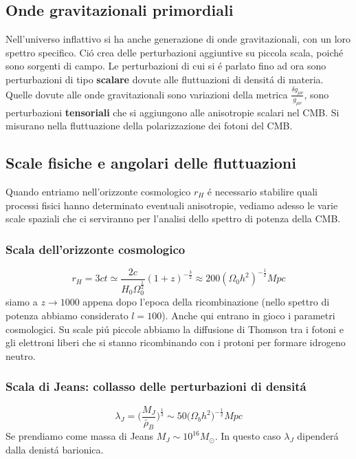 \documentclass[12pt, a4paper]{article}
\begin{document}
\subsection{Onde gravitazionali primordiali}
Nell'universo inflattivo si ha anche generazione di onde gravitazionali, con un loro spettro specifico. Ci\'{o} crea delle perturbazioni aggiuntive su piccola scala, poich\'{e} sono sorgenti di campo. Le perturbazioni di cui si \'{e} parlato fino ad ora sono perturbazioni di tipo \textbf{scalare} dovute alle fluttuazioni di densit\'{a} di materia. Quelle dovute alle onde gravitazionali sono variazioni della metrica $\frac{\delta g_{\mu \nu}}{g_{\mu \nu}}$, sono perturbazioni \textbf{tensoriali} che si aggiungono alle anisotropie scalari nel CMB. Si misurano nella fluttuazione della polarizzazione dei fotoni del CMB.
\subsection{Scale fisiche e angolari delle fluttuazioni}
Quando entriamo nell'orizzonte cosmologico $r_H$ \'{e} necessario stabilire quali processi fisici hanno determinato eventuali anisotropie, vediamo adesso le varie scale spaziali che ci serviranno per l’analisi dello spettro di potenza della CMB.
\subsubsection{Scala dell'orizzonte cosmologico}
\begin{equation}
r_H=3ct\simeq \frac{2c}{H_0 \Omega_0^{\frac{1}{2}}}(1+z)^{-\frac{3}{2}} \approx 200 (\Omega_0 h^2)^{-\frac{1}{2}} Mpc
\end{equation}
siamo a $z\rightarrow 1000$ appena dopo l'epoca della ricombinazione (nello spettro di potenza abbiamo considerato $l=100$). Anche qui entrano in gioco i parametri cosmologici. Su scale pi\'{u} piccole abbiamo la diffusione di Thomson tra i fotoni e gli elettroni liberi che si stanno ricombinando con i protoni per formare idrogeno neutro.\\
\subsubsection{Scala di Jeans: collasso delle perturbazioni di densit\'{a} }
\begin{equation}
\lambda_J=\biggl(\frac{M_J}{\bar{\rho}_B}\biggr)^{\frac{1}{3}}\sim 50 \biggl(\Omega_b h^2\biggr)^{-\frac{1}{2}} Mpc
 \end{equation}
Se prendiamo come massa di Jeans $M_J\sim 10^{16} M_\odot$. In questo caso $\lambda_J$ dipender\'{a} dalla denist\'{a} barionica. 
\end{document}
